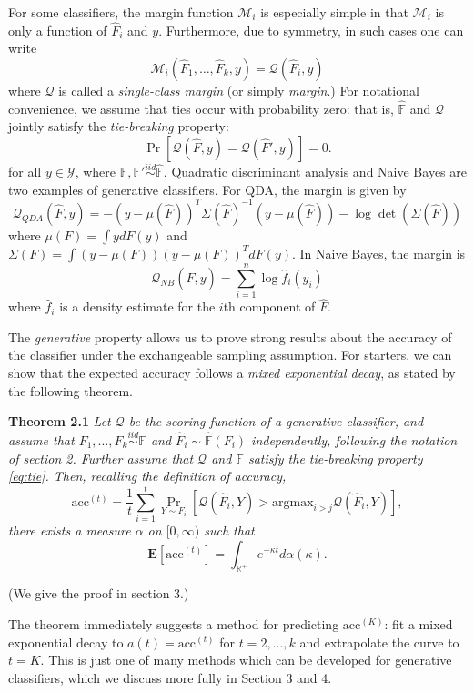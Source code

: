 \documentclass{article}
\newcommand{\E}{\textbf{E}}
\newcommand{\argmax}{\text{argmax}}
\begin{document}
For some classifiers, the margin function $\mathcal{M}_i$ is especially simple
in that $\mathcal{M}_i$ is only a function of $\hat{F}_i$ and $y$.
Furthermore, due to symmetry, in such cases one can write
\[
\mathcal{M}_i(\hat{F}_1,\hdots, \hat{F}_k, y) = \mathcal{Q}(\hat{F}_i, y)
\]
where $\mathcal{Q}$ is called a \emph{single-class margin} (or simply \emph{margin}.)
For notational convenience, we assume that ties occur with probability
zero: that is, $\hat{\mathbb{F}}$ and $\mathcal{Q}$ jointly satisfy the
\emph{tie-breaking} property:
\begin{equation}\label{eq:tie}
\Pr[\mathcal{Q}(\hat{F}, y) = \mathcal{Q}(\hat{F}', y)] = 0.
\end{equation}
for all $y \in \mathcal{Y}$, where $\mathbb{F}, \mathbb{F}' \stackrel{iid}{\sim} \hat{\mathbb{F}}$.
Quadratic discriminant analysis and Naive Bayes are two examples of
generative classifiers.  For QDA, the margin is given by
\[
\mathcal{Q}_{QDA}(\hat{F}, y) = -(y - \mu(\hat{F}))^T \Sigma(\hat{F})^{-1} (y-\mu(\hat{F})) - \log\det(\Sigma(\hat{F}))
\]
where $\mu(F) = \int y dF(y)$ and $\Sigma(F) = \int (y-\mu(F))(y-\mu(F))^T dF(y)$.
In Naive Bayes, the margin is
\[
\mathcal{Q}_{NB}(\hat{F},  y) = \sum_{i=1}^n \log \hat{f}_i(y_i)
\]
where $\hat{f}_i$ is a density estimate for the $i$th component of
$\hat{F}$.

The \emph{generative} property allows us to prove strong results about the accuracy of the classifier
under the exchangeable sampling assumption.  For starters, we can show that the
expected accuracy follows a \emph{mixed exponential decay}, as stated by the following theorem.

\noindent\textbf{Theorem 2.1}
\emph{
Let $\mathcal{Q}$ be the scoring function of a generative classifier, and 
assume that $F_1,\hdots, F_k \stackrel{iid}{\sim} \mathbb{F}$ and $\hat{F}_i \sim \hat{\mathbb{F}}(F_i)$ independently,
following the notation of section 2.
Further assume that $\mathcal{Q}$ and $\mathbb{F}$ satisfy the tie-breaking property \eqref{eq:tie}.
Then, recalling the definition of accuracy,
\[
\text{acc}^{(t)} = \frac{1}{t}\sum_{i=1}^t \Pr_{Y \sim F_i}[\mathcal{Q}(\hat{F}_i, Y) > \argmax_{i > j} \mathcal{Q}(\hat{F}_i, Y)],
\]
there exists a measure $\alpha$ on $[0, \infty)$ such that
\[
\E[\text{acc}^{(t)}] = \int_{\mathbb{R}^{+}} e^{-\kappa t} d\alpha(\kappa).
\]
}

(We give the proof in section 3.)

The theorem immediately suggests a method for predicting $\text{acc}^{(K)}$:
fit a mixed exponential decay to $a(t) = \text{acc}^{(t)}$ for $t = 2,\hdots, k$ and extrapolate the curve to $t = K$.
This is just one of many methods which can be developed for generative classifiers,
which we discuss more fully in Section 3 and 4.
\end{document}
